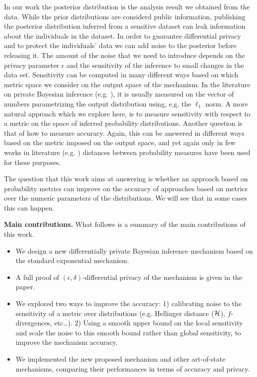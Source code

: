 \documentclass{article}
\begin{document}
In our work  the posterior distribution is the analysis result we obtained from the data.
While the prior distributions are considerd public information,  publishing the posterior distribution
inferred from a sensitive dataset can leak information about the individuals in the dataset.
In order to guarantee differential privacy and to protect the
individuals' data we can add noise to the posterior before releasing it.
The amount of the noise that we need to introduce
depends on the privacy parameter $\epsilon$ and the sensitivity of the inference to
small changes in the data set. 
Sensitivity can be computed in many different ways based on which metric space
we consider on the output space of the mechanism. In the literature on private Bayesian
inference (e.g. \cite{zhang2016differential,xiao2012bayesian}), it is usually measured on
the vector of numbers parametrizing the output distribution using, e.g. the $\ell_1$ norm.
A more natural approach which we explore here, is to measure sensitivity with respect to
a metric on the space of inferred probability distributions.
Another question is that of how to measure accuracy. Again,
this can be answered in different ways based on the metric
imposed on the output space, and yet again
only in few works in literature (e.g. \cite{zhang2016differential})
distances between probability measures have been used for these purposes.


The question that this work aims at answering is whether
an approach based on probability metrics can improve on
the accuracy of approaches based on metrics over
the numeric parameters of the distributions. 
We will see that in some cases this can happen.

\noindent \textbf{Main contributions.}
What follows is a summary of the main contributions of this work.
\begin{itemize}
	\item We design a new differentially private Bayesian inference mechanism based on the standard exponential mechanism.
    \item A full proof of $(\epsilon, \delta)$-differential privacy of the mechanism is given in the paper. 
	\item We explored two ways to improve the accuracy: 1) calibrating noise to the sensitivity of a metric over distributions
      (e.g. Hellinger distance ($\mathcal{H}$), $f$-divergences, etc\dots). 2) Using a smooth upper bound on the local sensitivity and scale
      the noise to this smooth bound rather than global sensitivity, to improve the mechanism accuracy.
  \item We implemented the new proposed mechanism and other art-of-state mechanisms, comparing their performances in terms of accuracy and privacy.
\end{itemize}
\end{document}
